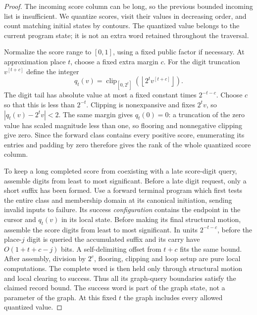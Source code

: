 \documentclass[11pt]{article}
\numberwithin{equation}{section}
\theoremstyle{definition}
\theoremstyle{remark}
\begin{document}
\begin{proof}
The incoming score column can be long, so the previous bounded incoming list is insufficient. We quantize scores, visit their values in decreasing order, and count matching initial states by contours. The quantized value belongs to the current program state; it is not an extra word retained throughout the traversal.

Normalize the score range to $[0,1]$, using a fixed public factor if
necessary.  At approximation place $t$, choose a fixed extra margin $c$.
For the digit truncation $v^{[t+c]}$ define the integer
\begin{equation}\label{eq:ctrl-score-quantization}
 q_t(v)=\operatorname{clip}_{[0,2^t]}
             \left(\left\lfloor 2^t v^{[t+c]}\right\rfloor\right).
\end{equation}
The digit tail has absolute value at most a fixed constant times
$2^{-t-c}$.  Choose $c$ so that this is less than $2^{-t}$.
Clipping is nonexpansive and fixes $2^t v$, so
$|q_t(v)-2^t v|<2$.  The same margin gives $q_t(0)=0$:
a truncation of the zero value has scaled magnitude less than one, so
flooring and nonnegative clipping give zero.  Since the forward class
contains every positive score, enumerating its entries and padding by
zero therefore gives the rank of the whole quantized score column.

To keep a long completed score from coexisting with a late score-digit query, assemble digits from least to most significant. Before a late digit request, only a short suffix has been formed. Use a forward terminal program which first tests the entire class and
membership domain at its canonical initiation, sending invalid inputs
to failure.  Its success \emph{configuration} contains the endpoint in
the cursor and $q_t(v)$ in its local state.  Before making its final
structural motion, assemble the score digits from least to most
significant.  In units $2^{-t-c}$, before the place-$j$ digit is queried
the accumulated suffix and its carry have $O(1+t+c-j)$ bits.  A
self-delimiting offset from $t+c$ fits the same bound.  After assembly,
division by $2^c$, flooring, clipping and loop setup are pure local computations.  The
complete word is then held only through structural motion and local
clearing to success.  Thus all its graph-query boundaries satisfy the
claimed record bound.  The success word is part of the graph state, not
a parameter of the graph.  At this fixed $t$ the graph includes every
allowed quantized value.


\end{proof}
\end{document}
